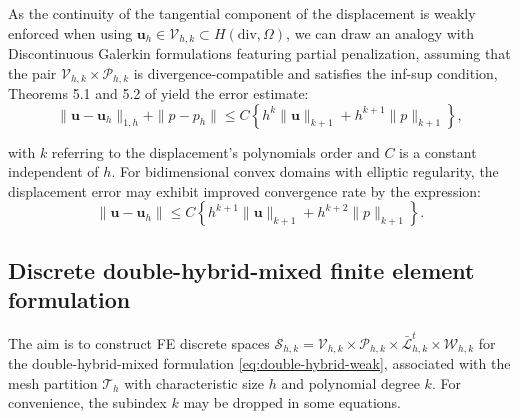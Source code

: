 \documentclass[english,11pt,3p,number,sort&compress]{elsarticle}
\begin{document}
As the continuity of the tangential component of the displacement is weakly enforced when using $\bm{u}_h \in \mathcal{V}_{h,k} \subset H(\text{div},\Omega)$, we can draw an analogy with Discontinuous Galerkin formulations featuring partial penalization, assuming that the pair $\mathcal{V}_{h,k} \times \mathcal{P}_{h,k}$ is divergence-compatible and satisfies the inf-sup condition, Theorems 5.1 and 5.2 of \cite{wang2007new} yield the error estimate:
\begin{equation}
\|\bm{u} - \bm{u}_h\|_{1,h} + \|p - p_h\| \leq C \left\{ h^k \|\bm{u}\|_{k+1} + h^{k+1} \|p\|_{k+1} \right\},
\end{equation}

\noindent with $k$ referring to the displacement's polynomials order and $C$ is a constant independent of $h$. For bidimensional convex domains with elliptic regularity, the displacement error may exhibit improved convergence rate by the expression:
\begin{equation}
\|\bm{u} - \bm{u}_h\| \leq C \left\{ h^{k+1} \|\bm{u}\|_{k+1} + h^{k+2} \|p\|_{k+1} \right\}.
\end{equation}

\subsection{Discrete double-hybrid-mixed finite element formulation}

The aim is to construct FE discrete spaces $\mathcal{S}_{h,k}=\mathcal{V}_{h,k} \times \mathcal{P}_{h,k} \times \bar{\mathcal{L}}^t_{h,k} \times \mathcal{W}_{h,k}$ for the double-hybrid-mixed formulation \eqref{eq:double-hybrid-weak}, associated with the mesh partition $\mathcal{T}_h$ with characteristic size $h$ and polynomial degree $k$. For convenience, the subindex $k$ may be dropped in some equations.
\end{document}
